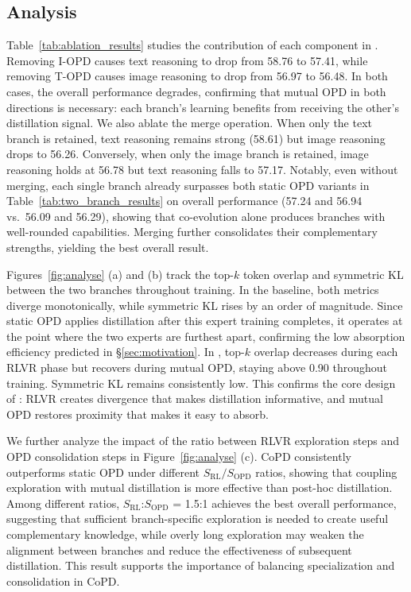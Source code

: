 \subsection{Analysis}
\label{sec:analysis_exps}

 Table~\ref{tab:ablation_results} studies the contribution of each component in \method. Removing I-OPD causes text reasoning to drop from 58.76 to 57.41, while removing T-OPD causes image reasoning to drop from 56.97 to 56.48. In both cases, the overall performance degrades, confirming that mutual OPD in both directions is necessary: each branch's learning benefits from receiving the other's distillation signal. We also ablate the merge operation. When only the text branch is retained, text reasoning remains strong (58.61) but image reasoning drops to 56.26. Conversely, when only the image branch is retained, image reasoning holds at 56.78 but text reasoning falls to 57.17. Notably, even without merging, each single branch already surpasses both static OPD variants in Table~\ref{tab:two_branch_results} on overall performance (57.24 and 56.94 vs.\ 56.09 and 56.29), showing that co-evolution alone produces branches with well-rounded capabilities. Merging further consolidates their complementary strengths, yielding the best overall result.


Figures~\ref{fig:analyse} (a) and (b) track the top-$k$ token overlap and symmetric KL between the two branches throughout training. In the baseline, both metrics diverge monotonically, while symmetric KL rises by an order of magnitude. Since static OPD applies distillation after this expert training completes, it operates at the point where the two experts are furthest apart, confirming the low absorption efficiency predicted in \S\ref{sec:motivation}. In \method, top-$k$ overlap decreases during each RLVR phase but recovers during mutual OPD, staying above 0.90 throughout training. Symmetric KL remains consistently low. This confirms the core design of \method: RLVR creates divergence that makes distillation informative, and mutual OPD restores proximity that makes it easy to absorb.

We further analyze the impact of the ratio between RLVR exploration steps and OPD consolidation steps in Figure~\ref{fig:analyse} (c). CoPD consistently outperforms static OPD under different $S_{\mathrm{RL}}/S_{\mathrm{OPD}}$ ratios, showing that coupling exploration with mutual distillation is more effective than post-hoc distillation. Among different ratios, $S_{\mathrm{RL}}$:$S_{\mathrm{OPD}}$ = 1.5:1 achieves the best overall performance, suggesting that sufficient branch-specific exploration is needed to create useful complementary knowledge, while overly long exploration may weaken the alignment between branches and reduce the effectiveness of subsequent distillation. This result supports the importance of balancing specialization and consolidation in CoPD.



